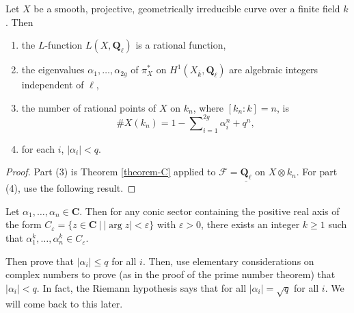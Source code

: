 \begin{lemma}
\label{lemma-count-points-projective}
Let $X$ be a smooth, projective, geometrically irreducible
curve over a finite field $k$. Then
\begin{enumerate}
\item the $L$-function $L(X, \mathbf{Q}_\ell)$ is a rational function,
\item the eigenvalues $\alpha_1, \ldots, \alpha_{2g}$ of $\pi_X^*$ on
$H^1(X_{\bar k}, \mathbf{Q}_\ell)$ are algebraic integers
independent of $\ell$,
\item the number of rational points of $X$ on $k_n$, where $[k_n : k] = n$, is
$$
\# X(k_n) = 1 - \sum\nolimits_{i = 1}^{2g}\alpha_i^n + q^n,
$$
\item for each $i$, $|\alpha_i| < q$.
\end{enumerate}
\end{lemma}

\begin{proof}
Part (3) is Theorem \ref{theorem-C} applied to $\mathcal{F} =
\underline{\mathbf{Q}_\ell}$ on $X \otimes k_n$. For part (4), use the
following result.
\end{proof}

\begin{exercise}
\label{exercise-powers}
Let $\alpha_1, \ldots, \alpha_n \in \mathbf{C}$. Then for any conic sector
containing the positive real axis of the form $C_\varepsilon = \{ z \in
\mathbf{C} \ | \ |\arg z| < \varepsilon \}$ with $\varepsilon > 0$, there exists
an integer $k \geq 1$ such that $\alpha_1^k, \ldots, \alpha_n^k \in
C_\varepsilon$.
\end{exercise}

\noindent
Then prove that $|\alpha_i| \leq q$ for all $i$. Then, use elementary
considerations on complex numbers to prove (as in the proof of the prime number
theorem) that $|\alpha_i| < q$. In fact, the Riemann hypothesis says that for
all $|\alpha_i| = \sqrt{q}$ for all $i$. We will come back to this later.

